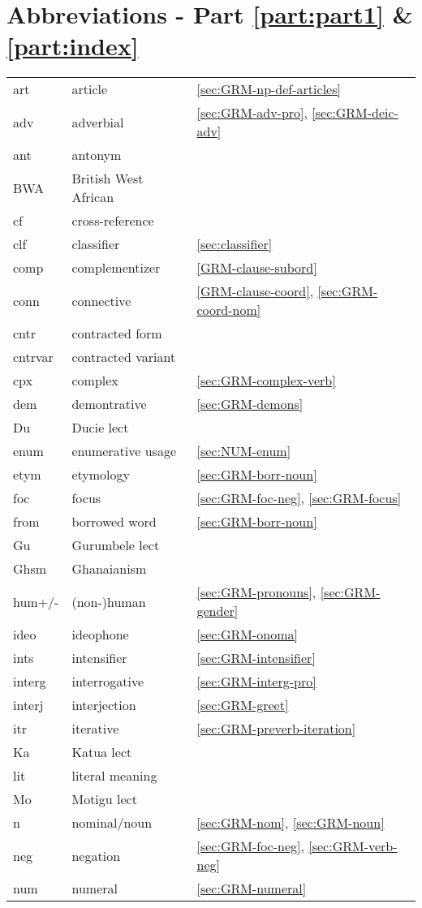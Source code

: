 \chapter*{Abbreviations - Part \ref{part:part1} \& \ref{part:index}}
\label{sec-AB}


 \begin{tabular}{lll}
  
art   &    article   & \ref{sec:GRM-np-def-articles}\\
adv & adverbial & \ref{sec:GRM-adv-pro}, \ref{sec:GRM-deic-adv}\\
ant & antonym & \\
BWA & British West African & \\
cf & cross-reference&\\
clf   &    classifier   &\ref{sec:classifier}\\  
comp   &   complementizer   &\ref{GRM-clause-subord}\\  
conn   &    connective   &\ref{GRM-clause-coord}, \ref{sec:GRM-coord-nom}\\ 
cntr    &    contracted form   & \\
cntrvar    &    contracted variant   & \\
cpx    &    complex   &\ref{sec:GRM-complex-verb}\\   
dem   &   demontrative   &\ref{sec:GRM-demons}\\
Du & Ducie lect &\\
enum   &    enumerative usage &\ref{sec:NUM-enum}\\
etym   &    etymology &\ref{sec:GRM-borr-noun}\\
foc    &    focus   &\ref{sec:GRM-foc-neg}, \ref{sec:GRM-focus}\\    
  from    &    borrowed word &\ref{sec:GRM-borr-noun}\\
  Gu & Gurumbele lect &\\
    Ghsm & Ghanaianism &\\
hum+/-   &   (non-)human   & \ref{sec:GRM-pronouns}, \ref{sec:GRM-gender}\\
ideo    &    ideophone   &\ref{sec:GRM-onoma}\\ 
ints    &    intensifier   &\ref{sec:GRM-intensifier}\\ 
interg   &    interrogative     &\ref{sec:GRM-interg-pro}\\
 interj    &    interjection   &\ref{sec:GRM-greet}\\  
   itr    &    iterative   & \ref{sec:GRM-preverb-iteration}\\
Ka &Katua lect & \\
    lit    &    literal meaning & \\
    Mo &Motigu lect & \\
  n    &    nominal/noun   & \ref{sec:GRM-nom}, \ref{sec:GRM-noun}\\
neg    &    negation   & \ref{sec:GRM-foc-neg}, \ref{sec:GRM-verb-neg}\\  
num   &   numeral  &  \ref{sec:GRM-numeral}\\
\end{tabular}

